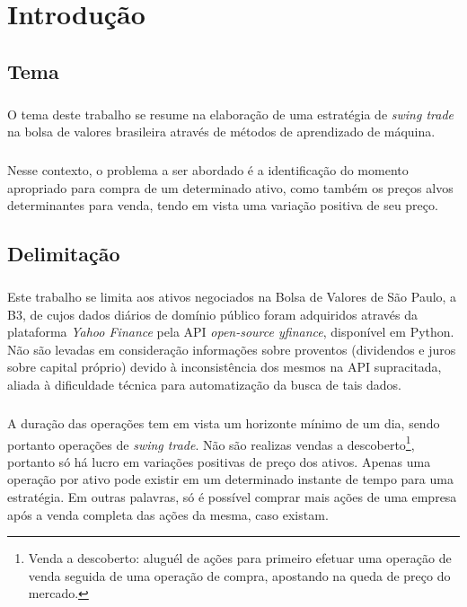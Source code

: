\chapter{Introdução}
\label{cap1}



\section{Tema}

\paragraph{} O tema deste trabalho se resume na elaboração de uma estratégia de \textit{swing trade} na bolsa de valores brasileira através de métodos de aprendizado de máquina.

\paragraph{} Nesse contexto, o problema a ser abordado é a identificação do momento apropriado para compra de um determinado ativo, como também os preços alvos determinantes para venda, tendo em vista uma variação positiva de seu preço.



\section{Delimitação}

\paragraph{} Este trabalho se limita aos ativos negociados na Bolsa de Valores de São Paulo, a B3, de cujos dados diários de domínio público foram adquiridos através da plataforma \textit{Yahoo Finance} pela API \textit{open-source yfinance}, disponível em Python. Não são levadas em consideração informações sobre proventos (dividendos e juros sobre capital próprio) devido à inconsistência dos mesmos na API supracitada, aliada à dificuldade técnica para automatização da busca de tais dados.

\paragraph{} A duração das operações tem em vista um horizonte mínimo de um dia, sendo portanto operações de \textit{swing trade}. Não são realizas vendas a descoberto\footnote{Venda a descoberto: aluguél de ações para primeiro efetuar uma operação de venda seguida de uma operação de compra, apostando na queda de preço do mercado.}, portanto só há lucro em variações positivas de preço dos ativos. Apenas uma operação por ativo pode existir em um determinado instante de tempo para uma estratégia. Em outras palavras, só é possível comprar mais ações de uma empresa após a venda completa das ações da mesma, caso existam.


